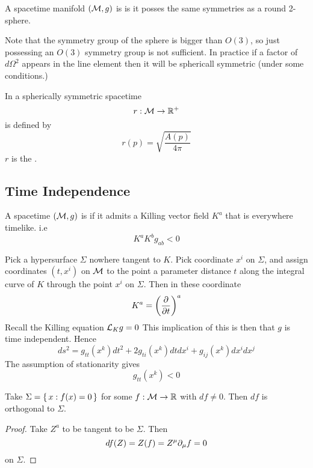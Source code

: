 \documentclass{article}
\begin{document}
\begin{definition}
A spacetime manifold $(\mathcal{M},g)$ is  is it posses the same symmetries as a round 2-sphere. 
\end{definition}

\begin{idea}
Note that the symmetry group of the sphere is bigger than $O(3)$, so just possessing an $O(3)$ symmetry group is not sufficient. In practice if a factor of $d\Omega^2$ appears in the line element then it will be sphericall symmetric (under some conditions.)
\end{idea}

\begin{definition}[Radius]
In a spherically symmetric spacetime
\[
r : \mathcal{M} \to \mathbb{R}^+
\]
is defined by 
\[
r(p) = \sqrt{\frac{A(p)}{4\pi}}
\]
$r$ is the . 
\end{definition}

\subsection{Time Independence}

\begin{definition}[Stationary]
 A spacetime $(\mathcal{M},g)$ is  if it admits a Killing vector field $K^a$ that is everywhere timelike. i.e 
 \[
  K^a K^b g_{ab} < 0 
 \]
\end{definition}
Pick a hypersurface $\Sigma$ nowhere tangent to $K$. Pick coordinate $x^i$ on $\Sigma$, and assign coordinates $(t,x^i)$ on $\mathcal{M}$ to the point a parameter distance $t$ along the integral curve of $K$ through the point $x^i$ on $\Sigma$. Then in these coordinate 
\[
K^a = \left( \frac{\partial}{\partial t} \right)^a
\]
Recall the Killing equation $\mathcal{L}_K g = 0$ This implication of this is then that $g$ is time independent. Hence
\[
ds^2 = g_{tt}(x^k) dt^2 + 2g_{ti}(x^k) dt dx^i + g_{ij}(x^k) dx^i dx^j 
\]
The assumption of stationarity gives 
\[
g_{tt}(x^k) < 0
\]

\begin{lemma}
Take $\Sigma=\set{x: f(x)=0}$ for some $f:\mathcal{M} \to \mathbb{R}$ with $df \neq 0$. Then $df$ is orthogonal to $\Sigma$.  
\end{lemma}
\begin{proof}
Take $Z^a$ to be tangent to be $\Sigma$. Then 
\[
df(Z) = Z(f) = Z^\mu \partial_\mu f = 0
\]
on $\Sigma$.
\end{proof}
\end{document}
